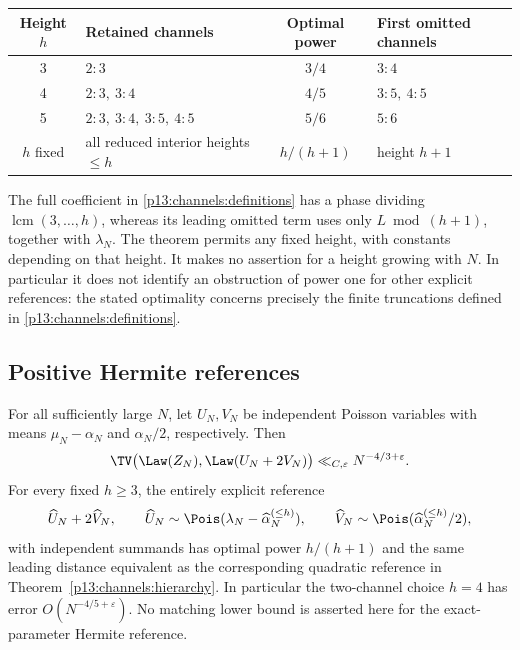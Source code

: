 \begin{center}
\begin{tabular}{@{}clcl@{}}
\toprule
Height $h$ & Retained channels & Optimal power & First omitted channels\\
\midrule
3 & $2:3$ & $3/4$ & $3:4$\\
4 & $2:3,\ 3:4$ & $4/5$ & $3:5,\ 4:5$\\
5 & $2:3,\ 3:4,\ 3:5,\ 4:5$ & $5/6$ & $5:6$\\
$h$ fixed & all reduced interior heights $\leq h$
   & $h/(h+1)$ & height $h+1$\\
\bottomrule
\end{tabular}
\end{center}

The full coefficient in \eqref{p13:channels:definitions} has a phase
dividing $\operatorname{lcm}(3,\ldots,h)$, whereas its leading omitted
term uses only $L\bmod(h+1)$, together with $\lambda_N$.
The theorem permits any fixed height, with constants depending on that
height.  It makes no assertion for a height growing with $N$.
In particular it does not identify an obstruction of power one for
other explicit references: the stated optimality concerns precisely the
finite truncations defined in \eqref{p13:channels:definitions}.

\subsection{Positive Hermite references}

\begin{corollary}
\label{p1:cor:compound}
For all sufficiently large \(N\), let \(U_N,V_N\) be independent
Poisson variables with means \(\mu_N-\alpha_N\) and
\(\alpha_N/2\), respectively. Then
\[
 \TV\bigl(\Law(Z_N),\Law(U_N+2V_N)\bigr)
       \ll_{C,\varepsilon}N^{-4/3+\varepsilon}.
\]
For every fixed \(h\ge3\), the entirely explicit reference
\[
 \widehat U_N+2\widehat V_N,\qquad
 \widehat U_N\sim\Pois(\lambda_N-\widehat\alpha_N^{(\le h)}),\qquad
 \widehat V_N\sim\Pois(\widehat\alpha_N^{(\le h)}/2),
\]
with independent summands has optimal power \(h/(h+1)\)
and the same leading distance equivalent as the corresponding
quadratic reference in Theorem~\ref{p13:channels:hierarchy}.
In particular the two-channel choice \(h=4\) has
error \(O(N^{-4/5+\varepsilon})\).
No matching lower bound is asserted here for the
exact-parameter Hermite reference.
\end{corollary}

